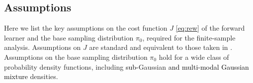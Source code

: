 \documentclass[journal,onecolumn]{IEEEtran}
\newtheorem{assumption}{A}
\newcommand{\alk}{\alpha_k}
\newcommand{\step}{\epsilon}
\newcommand{\grad}{\nabla}
\newcommand{\rew}{J}
\newcommand{\alt}{\alpha(t)}
\newcommand{\wass}{\mathcal{W}_2}
\newcommand{\gibbs}{\ids_{\infty}}
\newcommand{\idistr}{\ids_0}
\newcommand{\dtlaw}{\ids_{k}} %
\newcommand{\ctlaw}{\nu_{k\step}}
\newcommand{\law}{\textrm{Law}}
\newcommand{\ids}{\pi}
\newcommand{\idw}{\gamma}
\newcommand{\ksp}{k,\idw}
\newcommand{\constA}{A}
\newcommand{\constB}{B}
\begin{document}

\subsection{Assumptions}
\label{subsec:mainresults}
Here we list the key assumptions on the cost function $\rew$ \eqref{eq:rew} of the forward learner and the base sampling distribution $\idistr$, required for the finite-sample analysis. 
Assumptions on $\rew$ are standard and equivalent to those taken in \cite{raginsky2017non}. Assumptions on the base sampling distribution $\idistr$ hold for a wide class of probability density functions, including \textcolor{black}{sub-}Gaussian \textcolor{black}{and multi-modal Gaussian mixture} densities.

\end{document}
